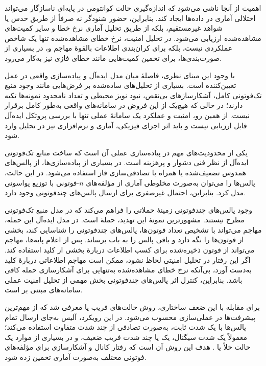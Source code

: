 اهمیت  از آنجا ناشی می‌شود که اندازه‌گیری حالت کوانتومی در پایه‌ای ناسازگار می‌تواند اختلالی آماری در داده‌ها ایجاد کند. بنابراین، حضور شنودگر نه صرفاً از طریق حدس یا شواهد غیرمستقیم، بلکه از طریق تحلیل آماری نرخ خطا و سایر کمیت‌های مشاهده‌شده ارزیابی می‌شود. در تحلیل امنیت، نرخ خطای مشاهده‌شده تنها یک شاخص عملکردی نیست، بلکه برای کران‌بندی اطلاعات بالقوهٔ مهاجم و، در بسیاری از صورت‌بندی‌ها، برای تخمین کمیت‌هایی مانند خطای فازی نیز به‌کار می‌رود.

با وجود این مبنای نظری، فاصلهٔ میان مدل ایده‌آل و پیاده‌سازی واقعی در عمل تعیین‌کننده است. بسیاری از تحلیل‌های ساده‌شده بر فرض‌هایی مانند وجود منبع تک‌فوتونی کامل، آشکارسازهای بی‌نقص، نبود نویز محیطی و تعداد نامحدود نمونه‌ها تکیه دارند؛ در حالی که هیچ‌یک از این فروض در سامانه‌های واقعی به‌طور کامل برقرار نیست. از همین رو، امنیت و عملکرد یک سامانهٔ  عملی تنها با بررسی پروتکل ایده‌آل قابل ارزیابی نیست و باید اثر اجزای فیزیکی، آماری و نرم‌افزاری نیز در تحلیل وارد شود.

یکی از محدودیت‌های مهم در پیاده‌سازی عملی  آن است که ساخت منابع تک‌فوتونی ایده‌آل از نظر فنی دشوار و پرهزینه است. در بسیاری از پیاده‌سازی‌ها، از پالس‌های همدوس تضعیف‌شده یا  همراه با تصادفی‌سازی فاز استفاده می‌شود. در این حالت، پالس‌ها را می‌توان به‌صورت مخلوطی آماری از مؤلفه‌های \(n\)-فوتونی با توزیع پواسونی مدل کرد. بنابراین، احتمال غیرصفری برای ارسال پالس‌های چندفوتونی وجود دارد.

وجود پالس‌های چندفوتونی زمینهٔ حملاتی را فراهم می‌کند که در مدل منبع تک‌فوتونی مطرح نیستند. مشهورترین نمونهٔ این تهدید، حملهٔ  است. در مدل ایده‌آل این حمله، مهاجم می‌تواند با تشخیص تعداد فوتون‌ها، پالس‌های چندفوتونی را شناسایی کند، بخشی از فوتون‌ها را نگه دارد و باقی پالس را به باب برساند. پس از اعلام پایه‌ها، مهاجم می‌تواند از فوتون ذخیره‌شده برای کسب اطلاعات دربارهٔ بخشی از کلید استفاده کند. اگر این رفتار در تحلیل امنیتی لحاظ نشود، ممکن است مهاجم اطلاعاتی دربارهٔ کلید به‌دست آورد، بی‌آنکه نرخ خطای مشاهده‌شده به‌تنهایی برای آشکارسازی حمله کافی باشد. بنابراین، کنترل اثر پالس‌های چندفوتونی بخش مهمی از تحلیل امنیت عملی سامانه‌های مبتنی بر  است.

برای مقابله با این ضعف ساختاری، روش حالت‌های فریب یا  معرفی شد که از مهم‌ترین پیشرفت‌ها در عملی‌سازی  محسوب می‌شود. در این رویکرد، آلیس به‌جای ارسال تمام پالس‌ها با یک شدت ثابت، به‌صورت تصادفی از چند شدت متفاوت استفاده می‌کند؛ معمولاً یک شدت سیگنال، یک یا چند شدت فریب ضعیف، و در بسیاری از موارد یک حالت خلأ یا . هدف این روش آن است که رفتار کانال و آشکارسازی برای مؤلفه‌های فوتونی مختلف به‌صورت آماری تخمین زده شود.

